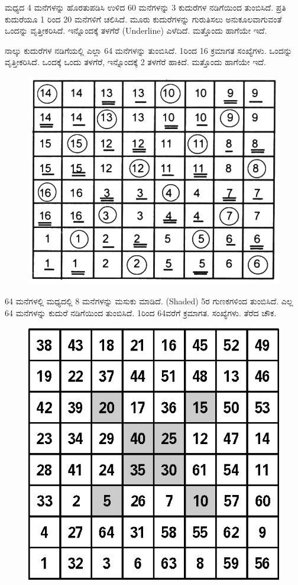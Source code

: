 ಮಧ್ಯದ 4 ಮನೆಗಳನ್ನು ಹೊರತುಪಡಿಸಿ ಉಳಿದ 60 ಮನೆಗಳನ್ನು 3 ಕುದುರೆಗಳ ನಡಿಗೆಯಿಂದ ತುಂಬಿಸಿದೆ. ಪ್ರತಿ ಕುದುರೆಯೂ 1 ರಿಂದ 20 ಮನೆಗಳಿಗೆ ಚಲಿಸಿದೆ. ಮೂರು ಕುದುರೆ\-ಗಳನ್ನು ಗುರುತಿಸಲು ಅನುಕೂಲವಾಗುವಂತೆ ಒಂದನ್ನು ವೃತ್ತೀಕರಿಸಿದೆ. ಇನ್ನೊಂದಕ್ಕೆ ತಳಗೆರೆ (Underline) ಎಳೆದಿದೆ. ಮತ್ತೊಂದು ಹಾಗೆಯೇ ಇದೆ.

ನಾಲ್ಕು ಕುದುರೆಗಳ ನಡಿಗೆಯಲ್ಲಿ ಎಲ್ಲಾ 64 ಮನೆಗಳನ್ನು ತುಂಬಿಸಿದೆ. 1ರಿಂದ 16 ಕ್ರಮಾಗತ ಸಂಖ್ಯೆಗಳು. ಒಂದನ್ನು ವೃತ್ತೀಕರಿಸಿದೆ. ಒಂದಕ್ಕೆ ಒಂದು ತಳಗೆರೆ, ಇನ್ನೊಂದಕ್ಕೆ 2 ತಳಗೆರೆ ಹಾಕಿದೆ. ಮತ್ತೊಂದು ಹಾಗೆಯೇ ಇದೆ.
\begin{figure}[H]
\includegraphics[scale=.88]{src/figures/chap6/fig6-19.jpg}
\end{figure}

64 ಮನೆಗಳಲ್ಲಿ ಮಧ್ಯದಲ್ಲಿ 8 ಮನೆಗಳನ್ನು ಮಸುಕು ಮಾಡಿದೆ. (Shaded) 5ರ ಗುಣಕ\-ಗಳಿಂದ ತುಂಬಿಸಿದೆ. ಎಲ್ಲ 64 ಮನೆಗಳನ್ನು ಕುದುರೆ ನಡಿಗೆಯಿಂದ ತುಂಬಿಸಿದೆ. 1ರಿಂದ 64ವರೆಗೆ ಕ್ರಮಾಗತ. ಸಂಖ್ಯೆಗಳು. ತೆರೆದ ಚೌಕ.
\begin{figure}[H]
\includegraphics[scale=.78]{src/figures/chap6/fig6-20.eps}
\end{figure}

